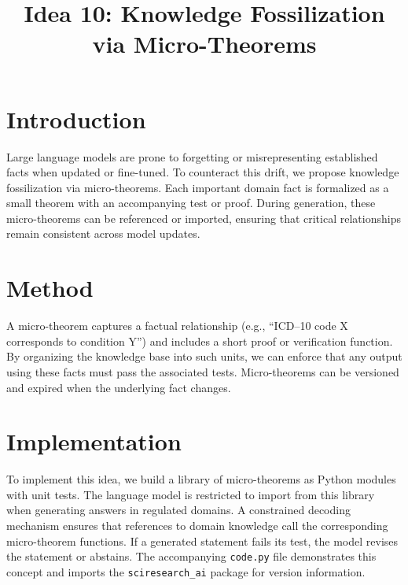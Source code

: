 \documentclass{article}
\title{Idea 10: Knowledge Fossilization via Micro-Theorems}
\author{}
\date{}
\begin{document}
\maketitle

\section{Introduction}
Large language models are prone to forgetting or misrepresenting
established facts when updated or fine-tuned. To counteract this
drift, we propose knowledge fossilization via micro-theorems. Each
important domain fact is formalized as a small theorem with an
accompanying test or proof. During generation, these micro-theorems
can be referenced or imported, ensuring that critical relationships
remain consistent across model updates.

\section{Method}
A micro-theorem captures a factual relationship (e.g., ``ICD--10 code
X corresponds to condition Y'') and includes a short proof or
verification function. By organizing the knowledge base into such
units, we can enforce that any output using these facts must pass the
associated tests. Micro-theorems can be versioned and expired when the
underlying fact changes.

\section{Implementation}
To implement this idea, we build a library of micro-theorems as Python
modules with unit tests. The language model is restricted to import
from this library when generating answers in regulated domains. A
constrained decoding mechanism ensures that references to domain
knowledge call the corresponding micro-theorem functions. If a
generated statement fails its test, the model revises the statement or
abstains. The accompanying \texttt{code.py} file demonstrates this
concept and imports the \texttt{sciresearch\_ai} package for version
information.
\end{document}
